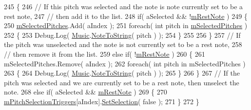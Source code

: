 \begin{DoxyCode}
245     \{
246         \textcolor{comment}{// If this pitch was selected and the note is note currently set to be a rest note,}
247         \textcolor{comment}{// then add it to the list.}
248         \textcolor{keywordflow}{if}( aSelected && !\hyperlink{group___s_c___p_s_c_priv_var_ga6eec175f775c35e2d0eb51dfe6def49f}{mRestNote} )
249         \{
250             \hyperlink{group___s_c___p_s_c_priv_var_ga5a8a5c31158f6af7f0c17d4fd03c5641}{mSelectedPitches}.Add( aIndex );
251             \textcolor{keywordflow}{foreach}( \textcolor{keywordtype}{int} pitch \textcolor{keywordflow}{in} \hyperlink{group___s_c___p_s_c_priv_var_ga5a8a5c31158f6af7f0c17d4fd03c5641}{mSelectedPitches} )
252             \{
253                 Debug.Log( \hyperlink{class_music}{Music}.\hyperlink{group___music_stat_func_ga85a22c905d56d4c5f4e62159bfecee8c}{NoteToString}( pitch ) );
254             \}
255 
256         \}
257         \textcolor{comment}{// If the pitch was unselected and the note is not currently set to be a rest note, }
258         \textcolor{comment}{// then remove it from the list.}
259         \textcolor{keywordflow}{else} \textcolor{keywordflow}{if}( !\hyperlink{group___s_c___p_s_c_priv_var_ga6eec175f775c35e2d0eb51dfe6def49f}{mRestNote} )
260         \{
261             mSelectedPitches.Remove( aIndex );
262             \textcolor{keywordflow}{foreach}( \textcolor{keywordtype}{int} pitch \textcolor{keywordflow}{in} mSelectedPitches )
263             \{
264                 Debug.Log( \hyperlink{class_music}{Music}.\hyperlink{group___music_stat_func_ga85a22c905d56d4c5f4e62159bfecee8c}{NoteToString}( pitch ) );
265             \}
266         \}
267         \textcolor{comment}{// If the pitch was selected and we are currently set to be a rest note, then unselect the note.}
268         \textcolor{keywordflow}{else} \textcolor{keywordflow}{if}( aSelected && \hyperlink{group___s_c___p_s_c_priv_var_ga6eec175f775c35e2d0eb51dfe6def49f}{mRestNote} )
269         \{
270             \hyperlink{group___s_c___p_s_c_priv_var_ga8431846d376b98bc6de5a872cce2c596}{mPitchSelectionTriggers}[aIndex].\hyperlink{group___s_c___p_s_t_pub_func_ga267db9aed38ba33ad44c26c84a1757df}{SetSelection}( \textcolor{keyword}{false} );
271         \}
272     \}
\end{DoxyCode}
\mbox{\label{group___s_c___p_s_c_handlers_ga8715b5976fdae2c56e05a60832553864}} 
